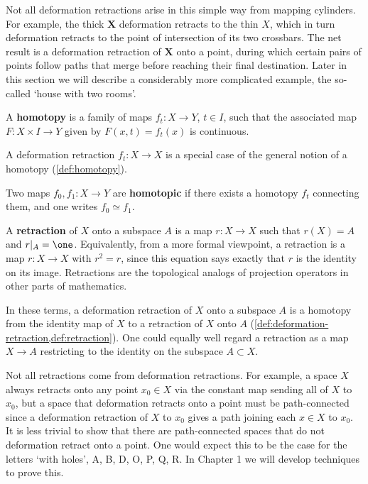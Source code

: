 Not all deformation retractions arise in this simple way from mapping cylinders. For
example, the thick $\mathbf{X}$ deformation retracts to the thin $X$, which in turn deformation
retracts to the point of intersection of its two crossbars. The net result is a deformation
retraction of $\mathbf{X}$ onto a point, during which certain pairs of points follow paths that
merge before reaching their final destination. Later in this section we will describe a
considerably more complicated example, the so-called `house with two rooms'.

\begin{definition}[Homotopy]
\label{def:homotopy}
\leanok
A \textbf{homotopy} is a family of maps $f_t : X \to Y$, $t \in I$, such that the associated
map $F : X \times I \to Y$ given by $F(x,t) = f_t(x)$ is continuous.
\end{definition}

A deformation retraction $f_t : X \to X$ is a special case of the general notion of a
homotopy (\cref{def:homotopy}).

\begin{definition}
\label{def:homotopic-maps}
\leanok
{}
Two maps $f_0, f_1 : X \to Y$ are \textbf{homotopic} if there exists a homotopy $f_t$
connecting them, and one writes $f_0 \simeq f_1$.
\end{definition}

\begin{definition}[Retraction]
\label{def:retraction}
\leanok
A \textbf{retraction} of $X$ onto a subspace $A$ is a map $r : X \to X$ such that
$r(X) = A$ and $r|_A = \one$. Equivalently, from a more formal viewpoint, a retraction
is a map $r : X \to X$ with $r^2 = r$, since this equation says exactly that $r$ is the
identity on its image. Retractions are the topological analogs of projection operators
in other parts of mathematics.
\end{definition}

In these terms, a deformation retraction of $X$ onto a subspace $A$ is a homotopy
from the identity map of $X$ to a retraction of $X$ onto $A$ (\cref{def:deformation-retraction,def:retraction}).
One could equally well regard a retraction as a map $X \to A$ restricting to the identity
on the subspace $A \subset X$.

Not all retractions come from deformation retractions. For example, a space $X$
always retracts onto any point $x_0 \in X$ via the constant map sending all of $X$ to
$x_0$, but a space that deformation retracts onto a point must be path-connected since
a deformation retraction of $X$ to $x_0$ gives a path joining each $x \in X$ to $x_0$. It is
less trivial to show that there are path-connected spaces that do not deformation retract
onto a point. One would expect this to be the case for the letters `with holes', A, B,
D, O, P, Q, R. In Chapter 1 we will develop techniques to prove this.

